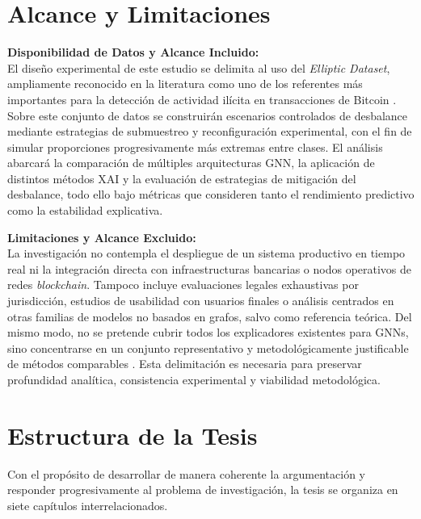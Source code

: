 \bigskip

\section{Alcance y Limitaciones}

\textbf{Disponibilidad de Datos y Alcance Incluido:}\\
El diseño experimental de este estudio se delimita al uso del \textit{Elliptic Dataset}, ampliamente reconocido en la literatura como uno de los referentes más importantes para la detección de actividad ilícita en transacciones de Bitcoin \cite{Weber2019Anti-MoneyForensics, Lawal2025AnDataset}. Sobre este conjunto de datos se construirán escenarios controlados de desbalance mediante estrategias de submuestreo y reconfiguración experimental, con el fin de simular proporciones progresivamente más extremas entre clases. El análisis abarcará la comparación de múltiples arquitecturas GNN, la aplicación de distintos métodos XAI y la evaluación de estrategias de mitigación del desbalance, todo ello bajo métricas que consideren tanto el rendimiento predictivo como la estabilidad explicativa.

\bigskip

\textbf{Limitaciones y Alcance Excluido:}\\
La investigación no contempla el despliegue de un sistema productivo en tiempo real ni la integración directa con infraestructuras bancarias o nodos operativos de redes \textit{blockchain}. Tampoco incluye evaluaciones legales exhaustivas por jurisdicción, estudios de usabilidad con usuarios finales o análisis centrados en otras familias de modelos no basados en grafos, salvo como referencia teórica. Del mismo modo, no se pretende cubrir todos los explicadores existentes para GNNs, sino concentrarse en un conjunto representativo y metodológicamente justificable de métodos comparables \cite{Armgaan2025GnnXemplar:Interpretability, Kosan2023GNNX-BENCH:Benchmarking}. Esta delimitación es necesaria para preservar profundidad analítica, consistencia experimental y viabilidad metodológica.

\bigskip

\section{Estructura de la Tesis}

Con el propósito de desarrollar de manera coherente la argumentación y responder progresivamente al problema de investigación, la tesis se organiza en siete capítulos interrelacionados.

